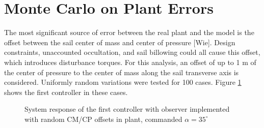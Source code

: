 \documentclass[]{aiaa-tc}%
\begin{document}
	\section{Monte Carlo on Plant Errors}

	The most significant source of error between the real plant and the model is the offset between the sail center of mass and center of pressure [Wie]. Design constraints, unaccounted occultation, and sail billowing could all cause this offset, which introduces disturbance torques. For this analysis, an offset of up to 1 m of the center of pressure to the center of mass along the sail transverse axis is considered.  Uniformly random variations were tested for 100 cases. Figure \ref{fig:Ctrl1MC} shows the first controller in these cases.

	\begin{figure}[H]
		\centering
		\caption{System response of the first controller with observer implemented with random CM/CP offsets in plant, commanded $\alpha=35^{\circ}$ }
		\label{fig:Ctrl1MC}
	\end{figure}	
\end{document}
